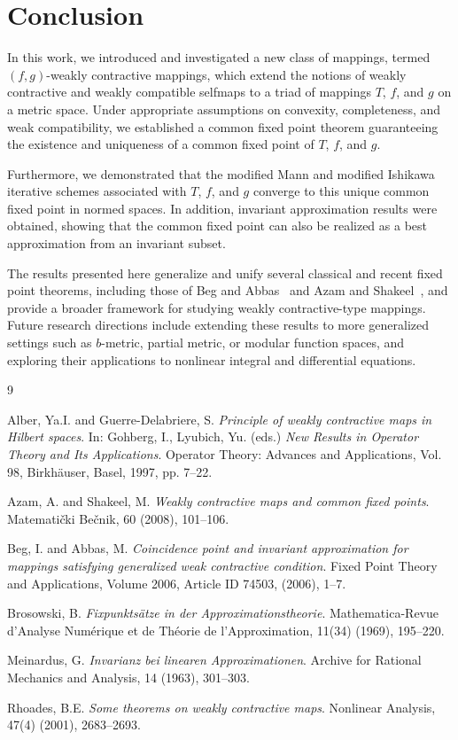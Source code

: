 \documentclass[11]{article}
\numberwithin{equation}{definition}
\begin{document}
\section{ Conclusion}

In this work, we introduced and investigated a new class of mappings, termed \((f,g)\)-weakly contractive mappings, which extend the notions of weakly contractive and weakly compatible selfmaps to a triad of mappings \(T\), \(f\), and \(g\) on a metric space. Under appropriate assumptions on convexity, completeness, and weak compatibility, we established a common fixed point theorem guaranteeing the existence and uniqueness of a common fixed point of \(T\), \(f\), and \(g\).

Furthermore, we demonstrated that the modified Mann and modified Ishikawa iterative schemes associated with \(T\), \(f\), and \(g\) converge to this unique common fixed point in normed spaces. In addition, invariant approximation results were obtained, showing that the common fixed point can also be realized as a best approximation from an invariant subset.

The results presented here generalize and unify several classical and recent fixed point theorems, including those of Beg and Abbas~\cite{Beg2006} and Azam and Shakeel~\cite{Azam2008}, and provide a broader framework for studying weakly contractive-type mappings. Future research directions include extending these results to more generalized settings such as \(b\)-metric, partial metric, or modular function spaces, and exploring their applications to nonlinear integral and differential equations.


\begin{thebibliography}{9}

Alber, Ya.I. and Guerre-Delabriere, S.
\textit{Principle of weakly contractive maps in Hilbert spaces}.
In: Gohberg, I., Lyubich, Yu. (eds.) \textit{New Results in Operator Theory and Its Applications}.
Operator Theory: Advances and Applications, Vol. 98, Birkhäuser, Basel, 1997, pp. 7–22.

Azam, A. and Shakeel, M.
\textit{Weakly contractive maps and common fixed points}.
Matematički Bečnik, 60 (2008), 101–106.

Beg, I. and Abbas, M.
\textit{Coincidence point and invariant approximation for mappings satisfying generalized weak contractive condition}.
Fixed Point Theory and Applications, Volume 2006, Article ID 74503, (2006), 1–7.

Brosowski, B.
\textit{Fixpunktsätze in der Approximationstheorie}.
Mathematica-Revue d'Analyse Numérique et de Théorie de l'Approximation, 11(34) (1969), 195–220.

Meinardus, G.
\textit{Invarianz bei linearen Approximationen}.
Archive for Rational Mechanics and Analysis, 14 (1963), 301–303.

Rhoades, B.E.
\textit{Some theorems on weakly contractive maps}.
Nonlinear Analysis, 47(4) (2001), 2683–2693.

\end{thebibliography}
\end{document}
